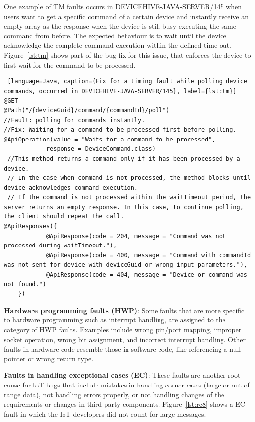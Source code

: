 One example of TM faults occurs in DEVICEHIVE-JAVA-SERVER/145 when users want to get a specific command of a certain device and instantly receive an empty array as the response when the device is still busy executing the same command from before. The expected behaviour is to wait until the device acknowledge the complete command execution within the defined time-out. Figure~\autoref{lst:tm} shows part of the bug fix for this issue, that enforces the device to first wait for the command to be processed.

\begin{lstlisting} [language=Java, caption={Fix for a timing fault while polling device commands, occurred in DEVICEHIVE-JAVA-SERVER/145}, label={lst:tm}] 
@GET
@Path("/{deviceGuid}/command/{commandId}/poll")
//Fault: polling for commands instantly.
//Fix: Waiting for a command to be processed first before polling.
@ApiOperation(value = "Waits for a command to be processed", 
            response = DeviceCommand.class)
 //This method returns a command only if it has been processed by a device. 
 // In the case when command is not processed, the method blocks until device acknowledges command execution.
 // If the command is not processed within the waitTimeout period, the server returns an empty response. In this case, to continue polling, the client should repeat the call.
@ApiResponses({
            @ApiResponse(code = 204, message = "Command was not processed during waitTimeout."),
            @ApiResponse(code = 400, message = "Command with commandId was not sent for device with deviceGuid or wrong input parameters."),
            @ApiResponse(code = 404, message = "Device or command was not found.")
    })
\end{lstlisting}

\textbf{Hardware programming faults (HWP)}: Some faults that are more specific to hardware programming such as interrupt handling, are assigned to the category of HWP faults. Examples include wrong pin/port mapping, improper socket operation, wrong bit assignment, and incorrect interrupt handling. Other faults in hardware code resemble those in software code, like referencing a null pointer or wrong return type.


\textbf{Faults in handling exceptional cases (EC)}: These faults are another root cause for IoT bugs that include mistakes in handling corner cases (large or out of range data), not handling errors properly, or not handling changes of the requirements or changes in third-party components. Figure~\autoref{lst:rc8} shows a EC fault in which the IoT developers did not count for large messages.

